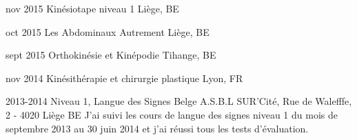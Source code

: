 \documentclass[]{cv-lea}
\begin{document}
\begin{entrylist}
\entry
{nov 2015}
{Kinésiotape niveau 1}
{Liège, BE}
{}
\end{entrylist}
\begin{entrylist}
\entry
{oct 2015}
{Les Abdominaux Autrement}
{Liège, BE}
{}
\end{entrylist}
\begin{entrylist}
\entry
{sept 2015}
{Orthokinésie et Kinépodie}
{Tihange, BE}
{}
\end{entrylist}
\begin{entrylist}
\entry
{nov 2014}
{Kinésithérapie et chirurgie plastique}
{Lyon, FR}
{}
\end{entrylist}
\begin{entrylist}
\entry
{2013-2014}
{Niveau 1, Langue des Signes Belge}
{A.S.B.L SUR’Cité, Rue de Walefffe, 2 - 4020 Liège BE}
{J’ai suivi les cours de langue des signes niveau 1 du mois de septembre 2013
au 30 juin 2014 et j’ai réussi tous les tests d’évaluation.
}
{}
\end{entrylist}
\end{document}
